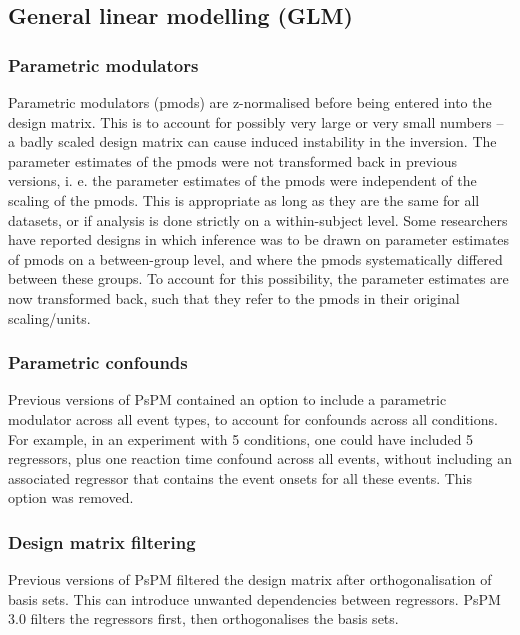 \documentclass[english]{article}
\numberwithin{equation}{section}
\numberwithin{figure}{section}
\begin{document}
\subsection*{General linear modelling (GLM)}

\subsubsection*{Parametric modulators}

Parametric modulators (pmods) are z-normalised before being entered
into the design matrix. This is to account for possibly very large
or very small numbers -- a badly scaled design matrix can cause induced
instability in the inversion. The parameter estimates of the pmods
were not transformed back in previous versions, i. e. the parameter
estimates of the pmods were independent of the scaling of the pmods.
This is appropriate as long as they are the same for all datasets,
or if analysis is done strictly on a within-subject level. Some researchers
have reported designs in which inference was to be drawn on parameter
estimates of pmods on a between-group level, and where the pmods systematically
differed between these groups. To account for this possibility, the
parameter estimates are now transformed back, such that they refer
to the pmods in their original scaling/units. 

\subsubsection*{Parametric confounds}

Previous versions of PsPM contained an option to include a parametric
modulator across all event types, to account for confounds across
all conditions. For example, in an experiment with 5 conditions, one
could have included 5 regressors, plus one reaction time confound
across all events, without including an associated regressor that
contains the event onsets for all these events. This option was removed. 

\subsubsection*{Design matrix filtering}

Previous versions of PsPM filtered the design matrix after orthogonalisation
of basis sets. This can introduce unwanted dependencies between regressors.
PsPM 3.0 filters the regressors first, then orthogonalises the basis
sets.
\end{document}
